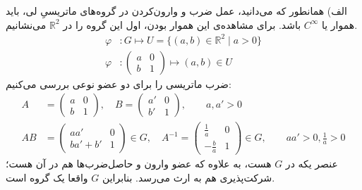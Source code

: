 \documentclass[a4paper, 12pt]{article}
\begin{document}
الف)
همانطور که می‌دانید، عمل ضرب و وارون‌کردن در گروه‌های ماتریسیِ لی، باید هموار یا 
$C^\infty$
باشد. برای مشاهده‌ی این هموار بودن، اول این گروه را در 
$\mathbb{R}^2$
می‌نشانیم.
\begin{equation*}
	\begin{aligned}
		\varphi &: G \longmapsto U = \{(a,b) \in \mathbb{R}^2 \;|\; a>0\} \\ \varphi &: \begin{pmatrix}
			a & 0 \\ b& 1
		\end{pmatrix}
		 \longmapsto (a,b) \in U
	\end{aligned}
\end{equation*}
 ضرب ماتریسی را برای دو عضو نوعی بررسی می‌کنیم:
\begin{equation*}
	\begin{aligned}
		A& = \begin{pmatrix}
			a & 0 \\ b & 1
		\end{pmatrix} , \quad B = \begin{pmatrix}
		a' & 0 \\ b' & 1
		\end{pmatrix} , \qquad a,a'>0
		\\
		 AB &= \begin{pmatrix}
		 	aa' & 0 \\ ba'+b' & 1
		 \end{pmatrix}  \in G , \quad A^{-1} = \begin{pmatrix}
		 \frac{1}{a} & 0 \\ -\frac{b}{a} & 1
		 \end{pmatrix}  \in G  , \qquad aa'>0 , \frac{1}{a}>0
	\end{aligned}
\end{equation*}
عنصر یکه در $G$ هست، به علاوه که عضو وارون و حاصل‌ضرب‌ها هم در آن هست؛ شرکت‌پذیری هم به ارث می‌رسد. بنابراین $G$ واقعا یک گروه است. 
\end{document}
